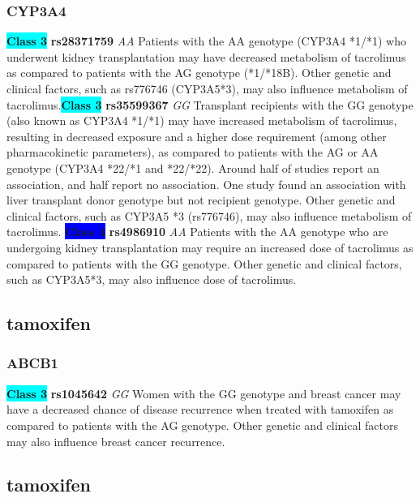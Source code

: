 \documentclass{book}
\begin{document}
\subsubsection{ CYP3A4 }

\begin{center}
\textbf{\colorbox{cyan} {Class 3}} \textbf{ rs28371759 } \textit{ AA }
Patients with the AA genotype (CYP3A4 *1/*1) who underwent kidney transplantation may have decreased metabolism of tacrolimus as compared to patients with the AG genotype (*1/*18B). Other genetic and clinical factors, such as rs776746 (CYP3A5*3), may also influence metabolism of tacrolimus.\textbf{\colorbox{cyan} {Class 3}} \textbf{ rs35599367 } \textit{ GG }
Transplant recipients with the GG genotype (also known as CYP3A4 *1/*1) may have increased metabolism of tacrolimus, resulting in decreased exposure and a higher dose requirement (among other pharmacokinetic parameters), as compared to patients with the AG or AA genotype (CYP3A4 *22/*1 and *22/*22). Around half of studies report an association, and half report no association. One study found an association with liver transplant donor genotype but not recipient genotype. Other genetic and clinical factors, such as CYP3A5 *3 (rs776746), may also influence metabolism of tacrolimus.
\textbf{\colorbox{blue} {Class 4}} \textbf{ rs4986910 } \textit{ AA }
Patients with the AA genotype who are undergoing kidney transplantation may require an increased dose of tacrolimus as compared to patients with the GG genotype. Other genetic and clinical factors, such as CYP3A5*3, may also influence dose of tacrolimus.

\end{center}\subsection{ tamoxifen }


\subsubsection{ ABCB1 }

\begin{center}
\textbf{\colorbox{cyan} {Class 3}} \textbf{ rs1045642 } \textit{ GG }
Women with the GG genotype and breast cancer may have a decreased chance of disease recurrence when treated with tamoxifen as compared to patients with the AG genotype. Other genetic and clinical factors may also influence breast cancer recurrence.


\end{center}\subsection{ tamoxifen }
\end{document}
